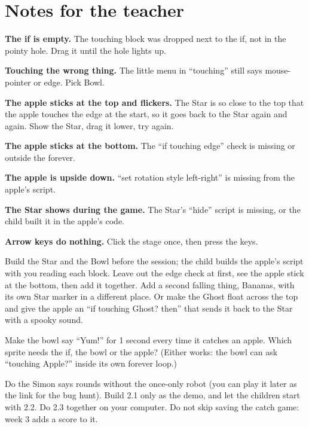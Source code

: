 \section{Notes for the teacher}
\begin{commonmistakes}
  \item \textbf{The if is empty.} The touching block was dropped next to the if, not in the pointy hole. Drag it until the hole lights up.
  \item \textbf{Touching the wrong thing.} The little menu in \enquote{touching} still says mouse-pointer or edge. Pick Bowl.
  \item \textbf{The apple sticks at the top and flickers.} The Star is so close to the top that the apple touches the edge at the start, so it goes back to the Star again and again. Show the Star, drag it lower, try again.
  \item \textbf{The apple sticks at the bottom.} The \enquote{if touching edge} check is missing or outside the forever.
  \item \textbf{The apple is upside down.} \enquote{set rotation style left-right} is missing from the apple's script.
  \item \textbf{The Star shows during the game.} The Star's \enquote{hide} script is missing, or the child built it in the apple's code.
  \item \textbf{Arrow keys do nothing.} Click the stage once, then press the keys.
\end{commonmistakes}

\begin{differentiation}
\supportpath Build the Star and the Bowl before the session; the child builds the apple's script with you reading each block. Leave out the edge check at first, see the apple stick at the bottom, then add it together.
\extensionpath Add a second falling thing, Bananas, with its own Star marker in a different place. Or make the Ghost float across the top and give the apple an \enquote{if touching Ghost? then} that sends it back to the Star with a spooky sound.
\end{differentiation}

\begin{stretchchallenge}
Make the bowl say \enquote{Yum!} for 1 second every time it catches an apple. Which sprite needs the if, the bowl or the apple? (Either works: the bowl can ask \enquote{touching Apple?} inside its own forever loop.)
\end{stretchchallenge}

\begin{teachernote}
Do the Simon says rounds without the once-only robot (you can play it later as the link for the bug hunt). Build 2.1 only as the demo, and let the children start with 2.2. Do 2.3 together on your computer. Do not skip saving the catch game: week 3 adds a score to it.
\end{teachernote}
